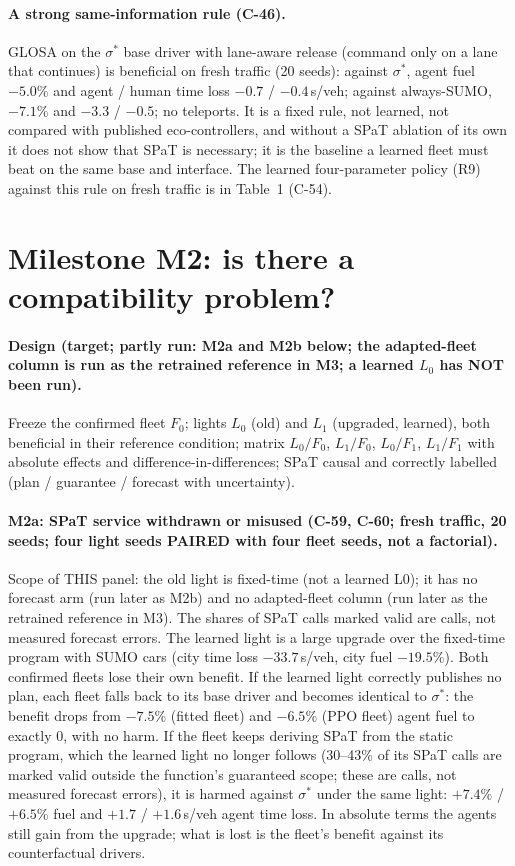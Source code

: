 \documentclass[11pt]{article}
\begin{document}
\paragraph{A strong same-information rule (C-46).} GLOSA on the $\sigma^*$ base driver with lane-aware release (command only on a lane
that continues) is beneficial on fresh traffic (20 seeds): against $\sigma^*$, agent fuel $-5.0\%$ and agent / human time loss $-0.7$ /
$-0.4$\,s/veh; against always-SUMO, $-7.1\%$ and $-3.3$ / $-0.5$; no teleports. It is a fixed rule, not learned, not compared with
published eco-controllers, and without a SPaT ablation of its own it does not show that SPaT is necessary; it is the baseline a learned
fleet must beat on the same base and interface.
The learned four-parameter policy (R9) against this rule on fresh traffic is in Table~1 (C-54).

\section{Milestone M2: is there a compatibility problem?}
\paragraph{Design (target; partly run: M2a and M2b below; the adapted-fleet column is run as the retrained reference in M3; a learned $L_0$ has NOT been run).} Freeze the confirmed fleet $F_0$; lights $L_0$ (old) and $L_1$ (upgraded, learned), both beneficial in their
reference condition; matrix $L_0/F_0$, $L_1/F_0$, $L_0/F_1$, $L_1/F_1$ with absolute effects and difference-in-differences; SPaT
causal and correctly labelled (plan / guarantee / forecast with uncertainty).
\paragraph{M2a: SPaT service withdrawn or misused (C-59, C-60; fresh traffic, 20 seeds; four light seeds PAIRED with four fleet
seeds, not a factorial).} Scope of THIS panel: the old light is fixed-time (not a learned L0); it has no forecast arm (run later as M2b)
and no adapted-fleet column (run later as the retrained reference in M3). The shares of SPaT calls marked valid are calls, not measured forecast errors. The learned light is a large
upgrade over the fixed-time program with SUMO cars (city time loss $-33.7$\,s/veh, city fuel $-19.5\%$). Both confirmed fleets lose their
own benefit. If the learned light correctly publishes no plan, each fleet falls back to its base driver and becomes identical to
$\sigma^*$: the benefit drops from $-7.5\%$ (fitted fleet) and $-6.5\%$ (PPO fleet) agent fuel to exactly 0, with no harm. If the fleet
keeps deriving SPaT from the static program, which the learned light no longer follows (30--43\% of its SPaT calls are marked valid
outside the function's guaranteed scope; these are calls, not measured forecast errors), it is harmed against $\sigma^*$ under the same light: $+7.4\%$ / $+6.5\%$ fuel and $+1.7$ / $+1.6$\,s/veh agent time loss. In
absolute terms the agents still gain from the upgrade; what is lost is the fleet's benefit against its counterfactual drivers.
\end{document}
